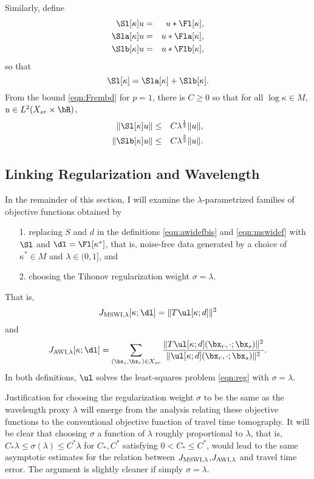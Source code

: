 Similarly, define
\begin{eqnarray}
  \label{eqn:sdeflam}
  \Sl[\kappa]u &=& u *\Fl[\kappa],  \nonumber \\
  \Sla[\kappa]u &=& u *\Fla[\kappa], \nonumber\\
  \Slb[\kappa]u &=& u *\Flb[\kappa], 
\end{eqnarray}
so that
\[
  \Sl[\kappa] = \Sla[\kappa] + \Slb[\kappa].
\]
From the bound \ref{eqn:Frembd} for $p=1$, there is $C \ge 0$ so that
for all $\log \kappa \in M$, $u \in L^2(X_{sr} \times \bR)$,
\begin{eqnarray}
  \label{eqn:Srembd}
  \|\Sl[\kappa]u\| &\le&  C\lambda^{\frac{1}{2}}\|u\|,\nonumber \\
  \|\Slb[\kappa]u\| & \le& C\lambda^{\frac{3}{2}}\|u\|.
\end{eqnarray}

\subsection{Linking Regularization and Wavelength}
In the remainder of this section, I will examine the $\lambda$-parametrized families of
objective functions obtained by
\begin{itemize}
\item[1. ]replacing $S$ and $d$ in the definitions \ref{eqn:awidefbis}
  and \ref{eqn:mswidef} with $\Sl$ and $\dl =\Fl[\kappa^*]$, that is,
  noise-free data generated by a choice of $\kappa^* \in M$ and
  $\lambda \in (0,1]$, and
\item[2. ] choosing the Tihonov regularization weight
  $\sigma = \lambda$.
\end{itemize}
That is,
\begin{equation}
  \label{eqn:mswideflam}
  J_{\rm MSWI,\lambda}[\kappa;\dl] =  \|T\ul[\kappa;d]\|^2
\end{equation}
and 
\begin{equation}
  \label{eqn:awideflam}
  J_{\rm AWI,\lambda}[\kappa;\dl] = \sum_{(\bx_s,\bx_r) \in X_{sr}} 
  \frac{\|T\ul[\kappa;d](\bx_r,\cdot;\bx_s)\|^2}{\|\ul[\kappa;d](\bx_r,\cdot;\bx_s)\|^2}.
\end{equation}
In both definitions, $\ul$ solves the least-squares problem \ref{eqn:reg} with
$\sigma = \lambda$.

Justification for choosing the regularization weight $\sigma$ to be the same as
the wavelength proxy $\lambda$ will emerge from the analysis relating these
objective functions to the conventional objective function of travel
time tomography. It will be clear that choosing $\sigma$ a function of
$\lambda$ roughly proportional to $\lambda$, that is, $C_*\lambda \le
\sigma(\lambda) \le C^*\lambda$ for $C_*,C^*$ satisfying $0 < C_* \le
C^*$, would lead to the same asymptotic estimates for the relation
between $J_{\rm MSWI,\lambda}$,$ J_{\rm AWI,\lambda} $ and travel time
error. The argument is slightly cleaner if simply $\sigma=\lambda$.

